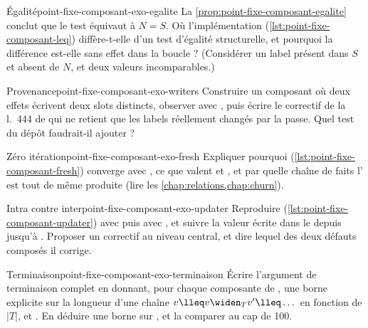 \begin{exercice}{Égalité}{point-fixe-composant-exo-egalite}
La \cref{prop:point-fixe-composant-egalite} conclut que le test
 équivaut à $N = S$. Où l'implémentation
 (\cref{lst:point-fixe-composant-leq}) diffère-t-elle
d'un test d'égalité structurelle, et pourquoi la différence est-elle sans
effet dans la boucle ? (Considérer un label présent dans $S$ et absent de
$N$, et deux valeurs incomparables.)
\end{exercice}

\begin{exercice}{Provenance}{point-fixe-composant-exo-writers}
Construire un composant où deux effets écrivent deux slots distincts,
observer  avec , puis écrire le
correctif de la l.~444 de  qui ne retient que
les labels réellement changés par la passe. Quel test du dépôt faudrait-il
ajouter ?
\end{exercice}

\begin{exercice}{Zéro itération}{point-fixe-composant-exo-fresh}
Expliquer pourquoi  (\cref{lst:point-fixe-composant-fresh})
converge avec , ce que valent  et
, et par quelle chaîne de faits l'\Error{} est
tout de même produite (lire les \cref{chap:relations,chap:churn}).
\end{exercice}

\begin{exercice}{Intra contre inter}{point-fixe-composant-exo-updater}
Reproduire  (\cref{lst:point-fixe-composant-updater}) avec
 puis avec , et suivre la
valeur écrite dans le  depuis
 jusqu'à
. Proposer un correctif au niveau
central, et dire lequel des deux défauts composés il corrige.
\end{exercice}

\begin{exercice}{Terminaison}{point-fixe-composant-exo-terminaison}
Écrire l'argument de terminaison complet en donnant, pour chaque composante
de , une borne explicite sur la longueur d'une chaîne
$v \lleq v \widen_T v' \lleq \dots$ en fonction de $|T|$,
 et . En déduire
une borne sur , et la comparer au cap de 100.
\end{exercice}
